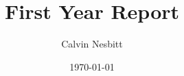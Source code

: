 \documentclass[11pt,a4,oneside]{article}
\title{First Year Report}
\date{\today}
\author{Calvin Nesbitt}
\begin{document}
\maketitle



\tableofcontents
\newpage
{}


\newcommand{\patha}{tex/Lyapunov}


\renewcommand{\patha}{tex/Lyapunov/Methodology}





\renewcommand{\patha}{tex/Lyapunov/L63-Results/}


\renewcommand{\patha}{tex/Lyapunov/L96-Results/}



\renewcommand{\patha}{tex/Lyapunov/Future-Directions/}


\renewcommand{\patha}{tex/LRT}





\renewcommand{\patha}{tex/LRT/Ruelle/}


\end{document}
